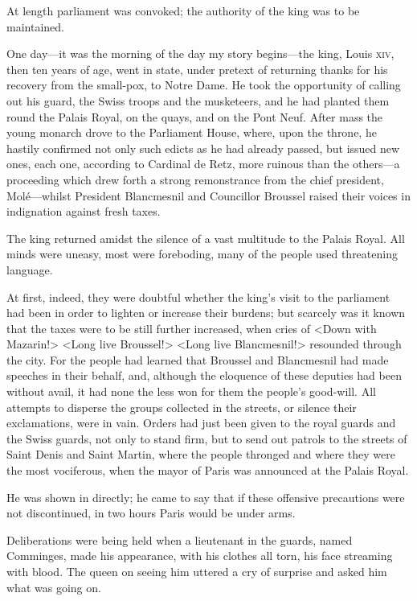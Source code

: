At length parliament was convoked; the authority of the king was to be maintained.

One day—it was the morning of the day my story begins—the king, Louis \textsc{xiv}, then ten years of age, went in state, under pretext of returning thanks for his recovery from the small-pox, to Notre Dame. He took the opportunity of calling out his guard, the Swiss troops and the musketeers, and he had planted them round the Palais Royal, on the quays, and on the Pont Neuf. After mass the young monarch drove to the Parliament House, where, upon the throne, he hastily confirmed not only such edicts as he had already passed, but issued new ones, each one, according to Cardinal de Retz, more ruinous than the others—a proceeding which drew forth a strong remonstrance from the chief president, Molé—whilst President Blancmesnil and Councillor Broussel raised their voices in indignation against fresh taxes.

The king returned amidst the silence of a vast multitude to the Palais Royal. All minds were uneasy, most were foreboding, many of the people used threatening language.

At first, indeed, they were doubtful whether the king's visit to the parliament had been in order to lighten or increase their burdens; but scarcely was it known that the taxes were to be still further increased, when cries of <Down with Mazarin!> <Long live Broussel!> <Long live Blancmesnil!> resounded through the city. For the people had learned that Broussel and Blancmesnil had made speeches in their behalf, and, although the eloquence of these deputies had been without avail, it had none the less won for them the people's good-will. All attempts to disperse the groups collected in the streets, or silence their exclamations, were in vain. Orders had just been given to the royal guards and the Swiss guards, not only to stand firm, but to send out patrols to the streets of Saint Denis and Saint Martin, where the people thronged and where they were the most vociferous, when the mayor of Paris was announced at the Palais Royal.

He was shown in directly; he came to say that if these offensive precautions were not discontinued, in two hours Paris would be under arms.

Deliberations were being held when a lieutenant in the guards, named Comminges, made his appearance, with his clothes all torn, his face streaming with blood. The queen on seeing him uttered a cry of surprise and asked him what was going on.

